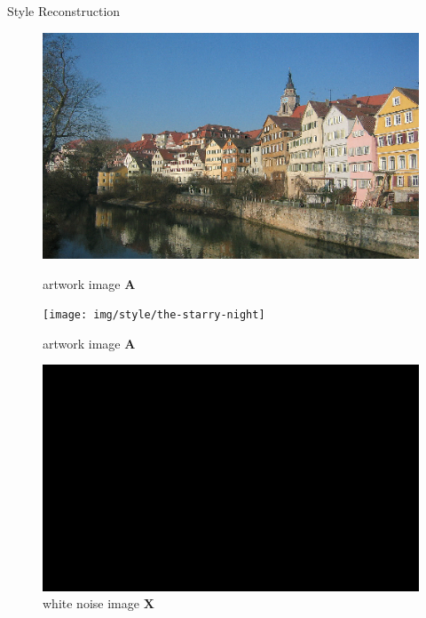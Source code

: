 \documentclass{beamer}
\begin{document}
\begin{frame}{Style Reconstruction}
\begin{figure}[ht]
    \begin{minipage}[b]{0.34\linewidth}
        \centering
        \includegraphics[width=\textwidth]{img/content/tubingen}
        \caption*{artwork image $\mathbf{A}$}
    \end{minipage}
    \hspace{0.5cm}
    \begin{minipage}[b]{0.34\linewidth}
        \centering
        \texttt{[image: img/style/the-starry-night]}
        \caption*{artwork image $\mathbf{A}$}
    \end{minipage}
    \hspace{0.5cm}
    \begin{minipage}[b]{0.34\linewidth}
        \centering
        \includegraphics[width=\textwidth]{img/style/noise}
        \caption*{white noise image $\mathbf{X}$}
    \end{minipage}
\end{figure}
\end{frame}
\end{document}
